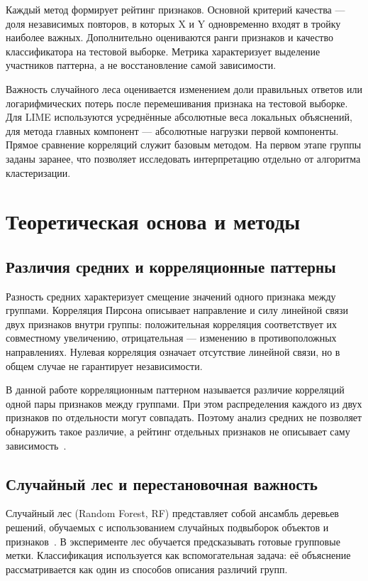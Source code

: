 \documentclass{article}
\begin{document}
Каждый метод формирует рейтинг признаков. Основной критерий качества --- доля независимых повторов, в которых X и Y одновременно входят в тройку наиболее важных. Дополнительно оцениваются ранги признаков и качество классификатора на тестовой выборке. Метрика характеризует выделение участников паттерна, а не восстановление самой зависимости.

Важность случайного леса оценивается изменением доли правильных ответов или логарифмических потерь после перемешивания признака на тестовой выборке. Для LIME используются усреднённые абсолютные веса локальных объяснений, для метода главных компонент --- абсолютные нагрузки первой компоненты. Прямое сравнение корреляций служит базовым методом. На первом этапе группы заданы заранее, что позволяет исследовать интерпретацию отдельно от алгоритма кластеризации.

\section{Теоретическая основа и методы}

\subsection{Различия средних и корреляционные паттерны}

Разность средних характеризует смещение значений одного признака между группами. Корреляция Пирсона описывает направление и силу линейной связи двух признаков внутри группы: положительная корреляция соответствует их совместному увеличению, отрицательная --- изменению в противоположных направлениях. Нулевая корреляция означает отсутствие линейной связи, но в общем случае не гарантирует независимости.

В данной работе корреляционным паттерном называется различие корреляций одной пары признаков между группами. При этом распределения каждого из двух признаков по отдельности могут совпадать. Поэтому анализ средних не позволяет обнаружить такое различие, а рейтинг отдельных признаков не описывает саму зависимость~\cite{connor2026}.

\subsection{Случайный лес и перестановочная важность}

Случайный лес (Random Forest, RF) представляет собой ансамбль деревьев решений, обучаемых с использованием случайных подвыборок объектов и признаков~\cite{breiman2001}. В эксперименте лес обучается предсказывать готовые групповые метки. Классификация используется как вспомогательная задача: её объяснение рассматривается как один из способов описания различий групп.
\end{document}
